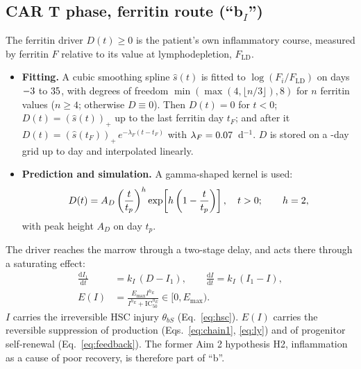 \documentclass[11pt]{article}
\newcommand{\dd}{\mathrm{d}}
\newcommand{\pos}[1]{\left(#1\right)_{+}}
\begin{document}
\subsection{CAR T phase, ferritin route \texorpdfstring{(``b$_I$'')}{(b-I)}}
The ferritin driver $D(t)\geq 0$ is the patient's own inflammatory course, measured by ferritin $F$ relative to its value at lymphodepletion, $F_{\mathrm{LD}}$.
\begin{itemize}
\item \textbf{Fitting.} A cubic smoothing spline $\hat s(t)$ is fitted to $\log(F_i/F_{\mathrm{LD}})$ on days $-3$ to $35$, with degrees of freedom $\min(\max(4,\lfloor n/3\rfloor),8)$ for $n$ ferritin values ($n\geq4$; otherwise $D\equiv0$). Then $D(t)=0$ for $t<0$; $D(t)=\pos{\hat s(t)}$ up to the last ferritin day $t_F$; and after it $D(t)=\pos{\hat s(t_F)}\,e^{-\lambda_F(t-t_F)}$ with $\lambda_F=0.07$~d$^{-1}$. $D$ is stored on a \valDrvDt-day grid up to day \valDrvEnd{} and interpolated linearly.
\item \textbf{Prediction and simulation.} A gamma-shaped kernel is used:
\begin{equation}
D(t) = A_D\left(\frac{t}{t_p}\right)^{h}\exp\!\left[h\left(1-\frac{t}{t_p}\right)\right],\quad t>0;\qquad h=2, \label{eq:kernel}
\end{equation}
with peak height $A_D$ on day $t_p$.
\end{itemize}

The driver reaches the marrow through a two-stage delay, and acts there through a saturating effect:
\begin{align}
\frac{\dd I_1}{\dd t} &= k_I\,(D - I_1), \qquad \frac{\dd I}{\dd t} = k_I\,(I_1 - I), \label{eq:lag}\\
E(I) &= \frac{E_{\max} I^{h_E}}{I^{h_E} + \mathrm{IC}_{50}^{h_E}} \in [0, E_{\max}). \label{eq:E}
\end{align}
$I$ carries the irreversible HSC injury $\theta_{bS}$ (Eq.~\ref{eq:hsc}). $E(I)$ carries the reversible suppression of production (Eqs.~\ref{eq:chain1}, \ref{eq:ly}) and of progenitor self-renewal (Eq.~\ref{eq:feedback}). The former Aim 2 hypothesis H2, inflammation as a cause of poor recovery, is therefore part of ``b''.
\end{document}
